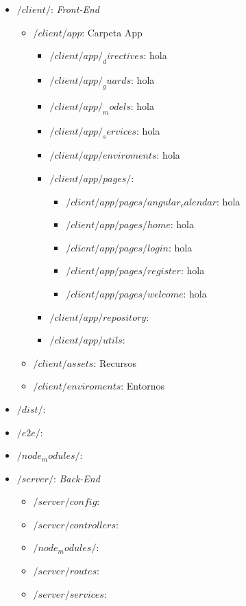 \begin{itemize}
	\item \textbf{$/client/$}: \emph{Front-End} 
	\begin{itemize}
	\item \textbf{$/client/app$}: Carpeta App
		\begin{itemize}
		\item \textbf{$/client/app/_directives$}: hola
		\item \textbf{$/client/app/_guards$}: hola
		\item \textbf{$/client/app/_models$}: hola
		\item \textbf{$/client/app/_services$}:  hola
		\item \textbf{$/client/app/enviroments$}:  hola
		\item \textbf{$/client/app/pages/$}:  
			\begin{itemize}
			\item \textbf{$/client/app/pages/angular_calendar $}:  hola
			\item \textbf{$/client/app/pages/home $}:   hola
			\item \textbf{$/client/app/pages/login $}:   hola
			\item \textbf{$/client/app/pages/register $}:   hola
			\item \textbf{$/client/app/pages/welcome $}:   hola
			\end{itemize}
		\item \textbf{$/client/app/repository $}:  
		\item \textbf{$/client/app/utils $}:  
		\end{itemize}
	\item \textbf{$/client/assets $}: Recursos  
	\item \textbf{$/client/enviroments $}:  Entornos
   \end{itemize}
	\item \textbf{$/dist/ $}:
	\item \textbf{$/e2e/ $}:
	\item \textbf{$/node_modules/ $}:
	\item \textbf{$/server/ $}:  \emph{Back-End} 
		\begin{itemize}
			\item \textbf{$/server/config $}:
			\item \textbf{$/server/controllers $}:
			\item \textbf{$/node_modules/ $}:
			\item \textbf{$/server/routes $}:
			\item \textbf{$/server/services $}:
		\end{itemize}
\end{itemize}

